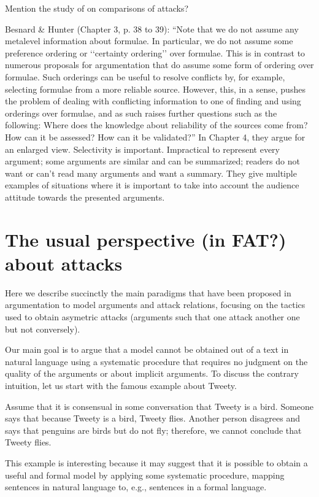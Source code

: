 \documentclass[version=3.21, pagesize, twoside=off, bibliography=totoc, DIV=calc, fontsize=12pt, a4paper, french, english]{scrartcl}
\begin{document}
Mention the study of \cite{ICCS2018} on comparisons of attacks? 

Besnard \& Hunter (Chapter 3, p. 38 to 39): “Note that we do not assume any metalevel information about formulae. In particular, we do not assume some preference ordering or ‘‘certainty ordering’’ over formulae. This is in contrast to numerous proposals for argumentation that do assume some form of ordering over formulae. Such orderings can be useful to resolve conflicts by, for example, selecting formulae from a more reliable source. However, this, in a sense, pushes the problem of dealing with conflicting information to one of finding and using orderings over formulae, and as such raises further questions such as the following: Where does the knowledge about reliability of the sources come from? How can it be assessed? How can it be validated?” 
In Chapter 4, they argue for an enlarged view. Selectivity is important. Impractical to represent every argument; some arguments are similar and can be summarized; readers do not want or can’t read many arguments and want a summary. They give multiple examples of situations where it is important to take into account the audience attitude towards the presented arguments.

\section{The usual perspective (in FAT?) about attacks}
Here we describe succinctly the main paradigms that have been proposed in argumentation to model arguments and attack relations, focusing on the tactics used to obtain asymetric attacks (arguments such that one attack another one but not conversely).

Our main goal is to argue that a model cannot be obtained out of a text in natural language using a systematic procedure that requires no judgment on the quality of the arguments or about implicit arguments.
To discuss the contrary intuition, let us start with the famous example about Tweety.
\begin{example}
	Assume that it is consensual in some conversation that Tweety is a bird. Someone says that because Tweety is a bird, Tweety flies. Another person disagrees and says that penguins are birds but do not fly; therefore, we cannot conclude that Tweety flies.
\end{example}
This example is interesting because it may suggest that it is possible to obtain a useful and formal model by applying some systematic procedure, mapping sentences in natural language to, e.g., sentences in a formal language. 
\end{document}
